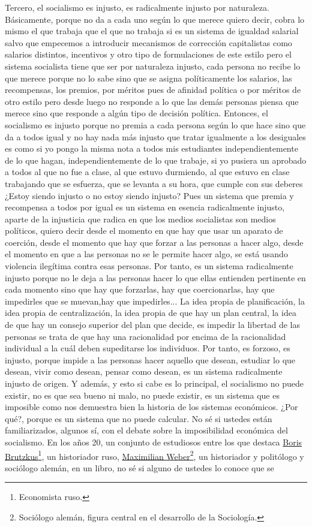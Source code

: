 Tercero, el socialismo es injusto, es radicalmente injusto por naturaleza. Básicamente, porque no da a cada uno según lo que merece quiero decir, cobra lo mismo el que trabaja que el que no trabaja si es un sistema de igualdad salarial salvo que empecemos a introducir mecanismos de corrección capitalistas como salarios distintos, incentivos y otro tipo de formulaciones de este estilo pero el sistema socialista tiene que ser por naturaleza injusto, cada persona no recibe lo que merece porque no lo sabe sino que se asigna políticamente los salarios, las recompensas, los premios, por méritos pues de afinidad política o por méritos de otro estilo pero desde luego no responde a lo que las demás personas piensa que merece sino que responde a algún tipo de decisión política. Entonces, el socialismo es injusto porque no premia a cada persona según lo que hace sino que da a todos igual y no hay nada más injusto que tratar igualmente a los desiguales es como si yo pongo la misma nota a todos mis estudiantes independientemente de lo que hagan, independientemente de lo que trabaje, si yo pusiera un aprobado a todos al que no fue a clase, al que estuvo durmiendo, al que estuvo en clase trabajando que se esfuerza, que se levanta a su hora, que cumple con sus deberes ¿Estoy siendo injusto o no estoy siendo injusto? Pues un sistema que premia y recompensa a todos por igual es un sistema en esencia radicalmente injusto, aparte de la injusticia que radica en que los medios socialistas son medios políticos, quiero decir desde el momento en que hay que usar un aparato de coerción, desde el momento que hay que forzar a las personas a hacer algo, desde el momento en que a las personas no se le permite hacer algo, se está usando violencia ilegítima contra esas personas. Por tanto, es un sistema radicalmente injusto porque no le deja a las personas hacer lo que ellas entienden pertinente en cada momento sino que hay que forzarlas, hay que coercionarlas, hay que impedirles que se muevan,hay que impedirles... La idea propia de planificación, la idea propia de centralización, la idea propia de que hay un plan central, la idea de que hay un consejo superior del plan que decide, es impedir la libertad de las personas se trata de que hay una racionalidad por encima de la racionalidad individual a la cuál deben supeditarse los individuos. Por tanto, es forzoso, es injusto, porque impide a las personas hacer aquello que desean, estudiar lo que desean, vivir como desean, pensar como desean, es un sistema radicalmente injusto de origen. Y además, y esto si cabe es lo principal, el socialismo no puede existir, no es que sea bueno ni malo, no puede existir, es un sistema que es imposible como nos demuestra bien la historia de los sistemas económicos. ¿Por qué?, porque es un sistema que no puede calcular. No sé si ustedes están familiarizados, algunos sí, con el debate sobre la imposibilidad económica del socialismo. En los años 20, un conjunto de estudiosos entre los que destaca \href{Boris Brutzkus}{Boris Brutzkus}\footnote{Economista ruso.}, un historiador ruso, \href{https://en.wikipedia.org/wiki/Max_Weber}{Maximilian Weber}\footnote{Sociólogo alemán, figura central en el desarrollo de la Sociología.}, un historiador y politólogo y sociólogo alemán, en un libro, no sé si alguno de ustedes lo conoce que se 